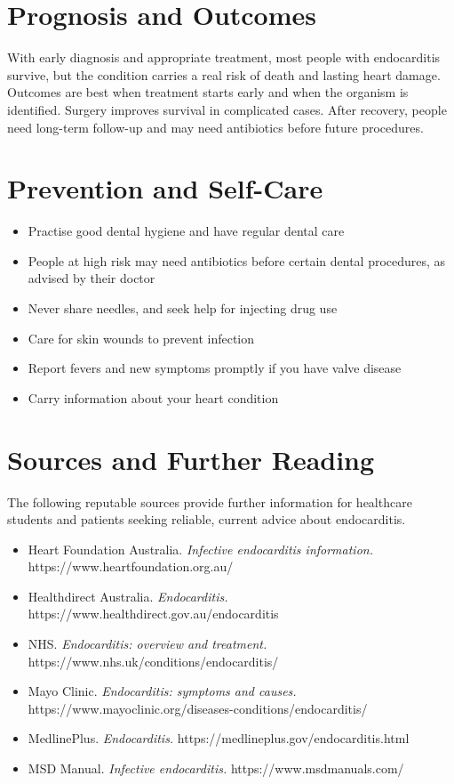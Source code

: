 \section*{Prognosis and Outcomes}
With early diagnosis and appropriate treatment, most people with endocarditis survive, but the condition carries a real risk of death and lasting heart damage. Outcomes are best when treatment starts early and when the organism is identified. Surgery improves survival in complicated cases. After recovery, people need long-term follow-up and may need antibiotics before future procedures.

\section*{Prevention and Self-Care}
\begin{itemize}
    \item Practise good dental hygiene and have regular dental care
    \item People at high risk may need antibiotics before certain dental procedures, as advised by their doctor
    \item Never share needles, and seek help for injecting drug use
    \item Care for skin wounds to prevent infection
    \item Report fevers and new symptoms promptly if you have valve disease
    \item Carry information about your heart condition
\end{itemize}

\section*{Sources and Further Reading}
The following reputable sources provide further information for healthcare students and patients seeking reliable, current advice about endocarditis.
\begin{itemize}
    \item Heart Foundation Australia. \textit{Infective endocarditis information.} https://www.heartfoundation.org.au/
    \item Healthdirect Australia. \textit{Endocarditis.} https://www.healthdirect.gov.au/endocarditis
    \item NHS. \textit{Endocarditis: overview and treatment.} https://www.nhs.uk/conditions/endocarditis/
    \item Mayo Clinic. \textit{Endocarditis: symptoms and causes.} https://www.mayoclinic.org/diseases-conditions/endocarditis/
    \item MedlinePlus. \textit{Endocarditis.} https://medlineplus.gov/endocarditis.html
    \item MSD Manual. \textit{Infective endocarditis.} https://www.msdmanuals.com/
\end{itemize}
